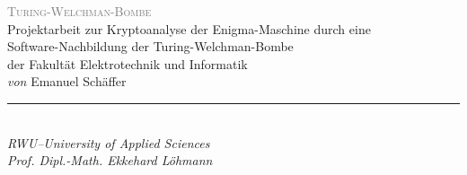 \documentclass{article}
\begin{document}
	\begin{center}
		\garamondfont
		\thispagestyle{empty}
		\vspace*{3cm}
		{\huge\scshape\textcolor{gray}{Turing-Welchman-Bombe\\}}
		\vspace{5cm}
		\large
		Projektarbeit zur Kryptoanalyse der Enigma-Maschine durch eine\\ 
		Software-Nachbildung der Turing-Welchman-Bombe\\
		der Fakultät Elektrotechnik und Informatik\\
		\vspace{2cm}
		\textit{von} Emanuel Schäffer 
		\hspace{0.4cm} \textcolor{gray}{\rule[-.2em]{0.6pt}{1.2em}} \hspace{0.4cm} 
		\DTMtoday\\
		\vspace{2cm}
		\vfill
		\textsl{RWU--University of Applied Sciences\\Prof. Dipl.-Math. Ekkehard Löhmann}
		\normalsize
	\end{center}
\end{document}
